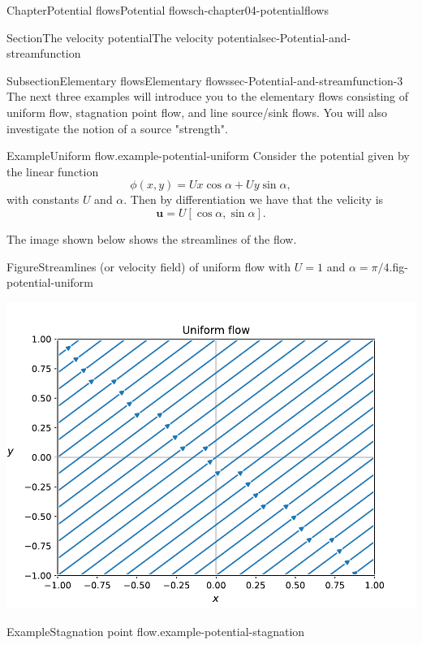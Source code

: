 \documentclass[oneside,10pt,]{book}
\numberwithin{equation}{section}
\newcommand{\bu}{\boldsymbol{u}}
\begin{document}
\begin{chapterptx}{Chapter}{Potential flows}{}{Potential flows}{}{}{ch-chapter04-potentialflows}
\begin{sectionptx}{Section}{The velocity potential}{}{The velocity potential}{}{}{sec-Potential-and-streamfunction}
%
\begin{subsectionptx}{Subsection}{Elementary flows}{}{Elementary flows}{}{}{sec-Potential-and-streamfunction-3}
The next three examples will introduce you to the elementary flows consisting of uniform flow, stagnation point flow, and line source\slash{}sink flows. You will also investigate the notion of a source "strength".%
\begin{example}{Example}{Uniform flow.}{example-potential-uniform}%
%
Consider the potential given by the linear function%
\begin{equation*}
\phi(x, y) = Ux \cos\alpha + Uy \sin\alpha,
\end{equation*}
with constants \(U\) and \(\alpha\). Then by differentiation we have that the velicity is%
\begin{equation*}
\bu = U[\cos\alpha, \sin\alpha].
\end{equation*}
%
\par
The image shown below shows the streamlines of the flow.%
\begin{figureptx}{Figure}{Streamlines (or velocity field) of uniform flow with \(U = 1\) and \(\alpha = \pi/4\).}{fig-potential-uniform}{}%
\begin{image}{0.05}{0.9}{0.05}{}%
\includegraphics[width=\linewidth]{external/uniformflow.pdf}
\end{image}%
\tcblower
\end{figureptx}%
\end{example}
\begin{example}{Example}{Stagnation point flow.}{example-potential-stagnation}%
%

\end{example}
\end{subsectionptx}
\end{sectionptx}
\end{chapterptx}
\end{document}
